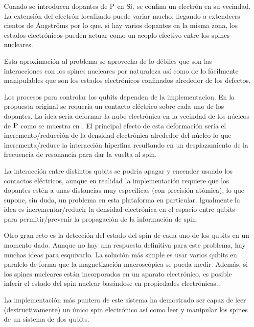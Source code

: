 Cuando se introducen dopantes de $\ce{P}$ en $\ce{Si}$, se confina un electrón en su vecindad. La extensión del electrón localizado puede variar mucho, llegando a extendeers cientos de Ångströms por lo que, si hay varios dopantes en la misma zona, los estados electrónicos pueden actuar como un acoplo efectivo entre los spines nucleares\cite{Slichter1990}.

Esta aproximación al problema se aprovecha de lo débiles que son las interacciones con los spines nucleares por naturaleza así como de lo fácilmente manipulables que son los estados electrónicos confinados alrededor de los defectos.

Los procesos para controlar los qubits dependen de la implementacion. En la propuesta original se requería un contacto eléctrico sobre cada uno de los dopantes. La idea sería deformar la nube electrónica en la vecindad de los núcleos de $\ce{P}$ como se muestra en . El principal efecto de esta deformación sería el incremento/reducción de la densidad electrónica alrededor del núcleo lo que incrementa/reduce la interacción hiperfina resultando en un desplazamiento de la frecuencia de resonancia para dar la vuelta al spin.

La interacción entre distintos qubits se podría apagar y encender usando los contactos eléctricos, aunque en realidad la implementación requiere que los dopantes estén a unas distancias muy específicas (con precisión atómica), lo que supone, sin duda, un problema en esta plataforma en particular. Igualmente la idea es incrementar/reducir la densidad electrónica en el espacio entre qubits para permitir/prevenir la propagación de la información de spin.

Otro gran reto es la detección del estado del spin de cada uno de los qubits en un momento dado. Aunque no hay una respuesta definitiva para este problema, hay muchas ideas para esquivarlo. La solución más simple es usar varios qubits en paralelo de forma que la magnetización macroscópica se pueda medir. Además, si los spines nucleares están incorporados en un aparato electrónico, es posible inferir el estado del spin nuclear basándose en propiedades electrónicas.\cite{Kane1992,Wald1994,Stich1996,Dixon1997,Dobers1988,Stegner2006}.

La implementación más puntera de este sistema ha demostrado ser capaz de leer (destructivamente) un único spin electrónico así como leer y manipular los spines de un sistema de dos qubits.\cite{Morello2010,Pla2012,Dehollain2014}


